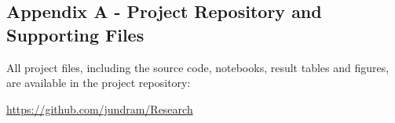 \subsection*{Appendix A - Project Repository and Supporting Files}

All project files, including the source code, notebooks, result tables and figures, are available in the project repository:

\url{https://github.com/jundram/Research}


